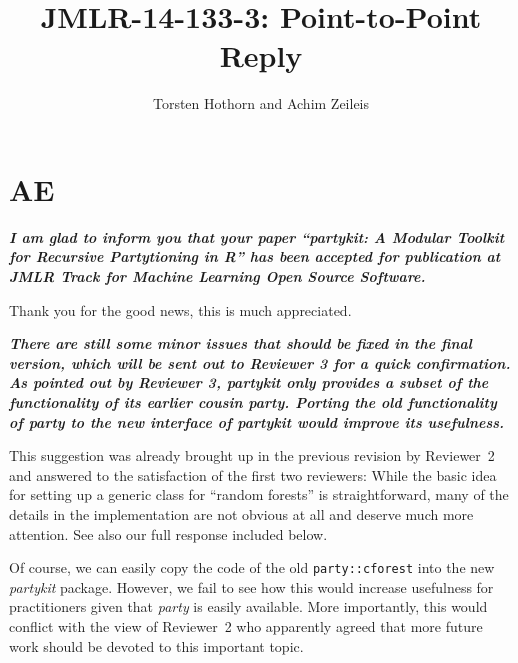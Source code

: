 \documentclass{article}
\title{JMLR-14-133-3: Point-to-Point Reply}
\author{Torsten Hothorn and Achim Zeileis}
\begin{document}
\maketitle

\section*{AE}

\textbf{\textit{%
I am glad to inform you that your paper ``partykit: A Modular Toolkit for
Recursive Partytioning in R'' has been accepted for publication at JMLR Track for Machine Learning
Open Source Software.
}}

\smallskip

Thank you for the good news, this is much appreciated.

\smallskip

\textbf{\textit{%
There are still some minor issues that should be fixed in the final version, which will
be sent out to Reviewer 3 for a quick confirmation.
As pointed out by Reviewer 3, partykit only provides a subset of the functionality of its
earlier cousin party. Porting the old functionality of party to the new
interface of partykit would improve its usefulness.}}

\smallskip

This suggestion was already brought up in the previous revision by Reviewer~2
and answered to the satisfaction of the first two reviewers: While the basic idea for
setting up a generic class for ``random forests'' is straightforward, many of the
details in the implementation are not obvious at all and deserve much more attention.
See also our full response included below.

Of course, we can easily copy the code of the old \texttt{party::cforest} into the
new \emph{partykit} package. However, we fail to see how this would increase usefulness
for practitioners given that \emph{party} is easily available. More importantly, this
would conflict with the view of Reviewer~2 who apparently agreed that more future
work should be devoted to this important topic.
\end{document}
